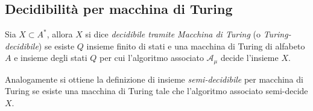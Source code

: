 \subsection{Decidibilità per macchina di Turing}
\begin{defi}
Sia $X \subset A^*$, allora $X$ si dice \emph{decidibile tramite Macchina di Turing} (o \emph{Turing-decidibile}) se esiste $Q$ insieme finito di stati e una macchina di Turing
di alfabeto $A$ e insieme degli stati $Q$ per cui l'algoritmo associato $\mathcal{A}_\mu$ decide l'insieme $X$.

\end{defi}

Analogamente si ottiene la definizione di insieme \emph{semi-decidibile} per macchina di Turing se esiste una macchina di Turing tale che l'algoritmo associato semi-decide $X$.

